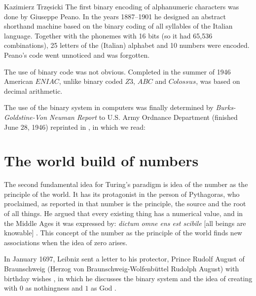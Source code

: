 \begin{artengenv}{Kazimierz Trzęsicki}
The first binary encoding of alphanumeric characters was done by Giuseppe Peano. In the years 1887--1901 he designed an abstract shorthand machine based on the binary coding of all syllables of the Italian language. Together with the phonemes with 16 bits (so it had 65,536 combinations), 25 letters of the (Italian) alphabet and 10 numbers were encoded. Peano's code went unnoticed and was forgotten.

The use of binary code was not obvious. Completed in the summer of 1946 American $ENIAC$, unlike binary coded $Z3$, $ABC$ and $Colossus$, was based on decimal arithmetic.

The use of the binary system in computers was finally determined by \emph{Burks-Goldstine-Von Neuman Report} to U.S. Army Ordnance Department (finished June 28, 1946) reprinted in \parencite*[p.105]{BurksGoldstineNeumann1947}, in which we read:


\section{The world build of numbers} 
The second fundamental idea for Turing's paradigm is idea of the number as the principle of the world. It has its protagonist in the person of Pythagoras, who proclaimed, as reported in \parencite[p.21]{Guthrie1987} that number is the principle, the source and the root of all things. He argued that every existing thing has a numerical value, and in the Middle Ages it was expressed by: \emph{dictum omne ens est scibile} [all beings are knowable]%
\parencites[pp.135--136]{Cherry2017}[see also][]{heschmeyer_two_2012}.
This concept of the number as the principle of the world finds new associations when the idea of zero arises.

In January 1697, Leibniz sent a letter to his protector, Prince Rudolf August of Braunschweig (Herzog von Braunschweig-Wolfenbüttel Rudolph August) with birthday wishes \parencite{list1697}, in which he discusses the binary system and the idea of creating with $0$ as nothingness and $1$ as God \parencite{Swetz2003}.


\end{artengenv}

